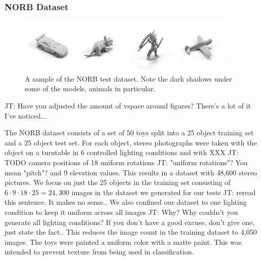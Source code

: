 \documentclass[10pt,twocolumn,letterpaper]{article}
\newcommand{\tompson}[1]{{\color{green} JT: #1}}
\begin{document}
\subsubsection{NORB Dataset}

\begin{figure}[h!]
\centering
\includegraphics[width=1.0\columnwidth]{./assets/NORBTestSmall.png}
\caption{A sample of the NORB test dataset. Note the dark shadows under some of the models, animals in particular.}
\label{fig:norb-samples}
\end{figure}

\tompson{Have you adjusted the amount of vspace around figures?  There's a lot of it I've noticed...}

The NORB dataset consists of a set of 50 toys split into a 25 object training set and a 25 object test set. For each object, stereo photographs were taken with the object on a turntable in 6 controlled lighting conditions and with XXX\tompson{TODO} camera positions of 18 uniform rotations\tompson{"uniform rotations"? You mean "pitch"?} and 9 elevation values. This results in a dataset with 48,600 stereo pictures.  We focus on just the 25 objects in the training set consisting of $6\cdot9\cdot18\cdot25=24,300$ images in the dataset we generated for our tests \tompson{reread this sentence. It makes no sense.}.  We also confined our dataset to one lighting condition to keep it uniform across all images\tompson{Why? Why couldn't you generate all lighting conditions? If you don't have a good excuse, don't give one, just state the fact.}.  This reduces the image count in the training dataset to 4,050 images.   The toys were painted a uniform color with a matte paint. This was intended to prevent texture from being used in classification.
\end{document}
